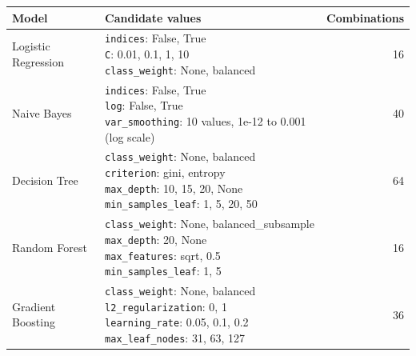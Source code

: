 \begin{tabular}{llr}
\toprule
Model & Candidate values & Combinations \\
\midrule
Logistic Regression & \makecell[l]{\texttt{indices}: False, True \\ \texttt{C}: 0.01, 0.1, 1, 10 \\ \texttt{class\_weight}: None, balanced} & 16 \\ \addlinespace
Naive Bayes & \makecell[l]{\texttt{indices}: False, True \\ \texttt{log}: False, True \\ \texttt{var\_smoothing}: 10 values, 1e-12 to 0.001 (log scale)} & 40 \\ \addlinespace
Decision Tree & \makecell[l]{\texttt{class\_weight}: None, balanced \\ \texttt{criterion}: gini, entropy \\ \texttt{max\_depth}: 10, 15, 20, None \\ \texttt{min\_samples\_leaf}: 1, 5, 20, 50} & 64 \\ \addlinespace
Random Forest & \makecell[l]{\texttt{class\_weight}: None, balanced\_subsample \\ \texttt{max\_depth}: 20, None \\ \texttt{max\_features}: sqrt, 0.5 \\ \texttt{min\_samples\_leaf}: 1, 5} & 16 \\ \addlinespace
Gradient Boosting & \makecell[l]{\texttt{class\_weight}: None, balanced \\ \texttt{l2\_regularization}: 0, 1 \\ \texttt{learning\_rate}: 0.05, 0.1, 0.2 \\ \texttt{max\_leaf\_nodes}: 31, 63, 127} & 36 \\
\bottomrule
\end{tabular}

